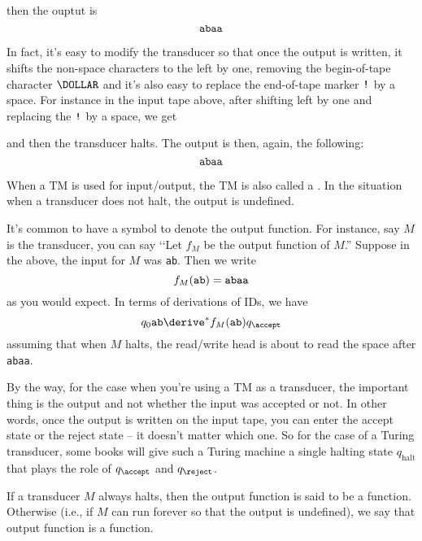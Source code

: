 then the ouptut is
\[
\text{\texttt{abaa}}
\]

In fact, it's easy to modify the transducer so that once the output is written,
it shifts the non-space characters to the left by one, removing the
begin-of-tape character $\DOLLAR$
and it's also easy to replace the end-of-tape marker $\operatorname{\text{\texttt{!}}}$ by a space.
For instance in the input tape above, after shifting left by one and
replacing the $\operatorname{\text{\texttt{!}}}$ by a space,
we get


and then the transducer halts.
The output is then, again, the following:
\[
\text{\texttt{abaa}}
\]

When a TM is used for input/output, the TM is also called a
.
In the situation when a transducer does not halt, the output
is undefined.

It's common to have a symbol to denote the output function.
For instance, say $M$ is the transducer,
you can say \lq\lq Let $f_M$ be the output function of $M$.''
Suppose in the above, the input for $M$ was \texttt{ab}.
Then we write
\[
f_M(\text{\texttt{ab}}) = \text{\texttt{abaa}}
\]
as you would expect.
In terms of derivations of IDs, we have
\[
q_0 \text{\texttt{ab}} \derive^* f_M(\text{\texttt{ab}})q_\accept 
\]
assuming that when $M$ halts, the read/write head is about to read
the space after \texttt{abaa}.

By the way, for the case when you're using a TM as a transducer,
the important thing is the output and not whether the input was accepted or
not.
In other words, once the output is written on the input tape, you can
enter the accept state or the reject state -- it doesn't matter which one.
So for the case of a Turing transducer, some books will give such a
Turing machine a single halting state $q_{\text{halt}}$ that plays the role of
$q_\accept$ and $q_\reject$.

If a transducer $M$ always halts, then the output function is said to be
a  function.
Otherwise (i.e., if $M$ can run forever so that  the output is undefined),
we say that output function is a  function.





